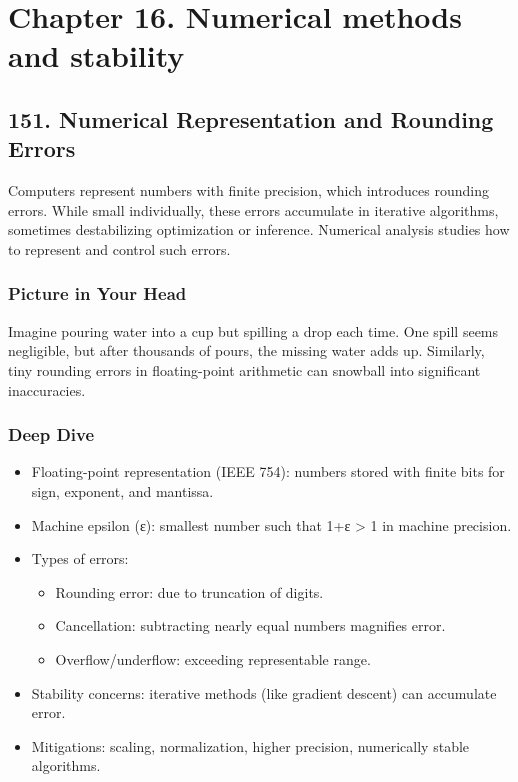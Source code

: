 \documentclass[
  letterpaper,
  DIV=11,
  numbers=noendperiod]{scrreprt}
\providecommand{\tightlist}{%
  \setlength{\itemsep}{0pt}\setlength{\parskip}{0pt}}
\begin{document}
\section{Chapter 16. Numerical methods and
stability}\label{chapter-16.-numerical-methods-and-stability}

\subsection{151. Numerical Representation and Rounding
Errors}\label{numerical-representation-and-rounding-errors}

Computers represent numbers with finite precision, which introduces
rounding errors. While small individually, these errors accumulate in
iterative algorithms, sometimes destabilizing optimization or inference.
Numerical analysis studies how to represent and control such errors.

\subsubsection{Picture in Your Head}\label{picture-in-your-head-150}

Imagine pouring water into a cup but spilling a drop each time. One
spill seems negligible, but after thousands of pours, the missing water
adds up. Similarly, tiny rounding errors in floating-point arithmetic
can snowball into significant inaccuracies.

\subsubsection{Deep Dive}\label{deep-dive-150}

\begin{itemize}
\item
  Floating-point representation (IEEE 754): numbers stored with finite
  bits for sign, exponent, and mantissa.
\item
  Machine epsilon (ε): smallest number such that 1+ε \textgreater{} 1 in
  machine precision.
\item
  Types of errors:

  \begin{itemize}
  \tightlist
  \item
    Rounding error: due to truncation of digits.
  \item
    Cancellation: subtracting nearly equal numbers magnifies error.
  \item
    Overflow/underflow: exceeding representable range.
  \end{itemize}
\item
  Stability concerns: iterative methods (like gradient descent) can
  accumulate error.
\item
  Mitigations: scaling, normalization, higher precision, numerically
  stable algorithms.
\end{itemize}
\end{document}
